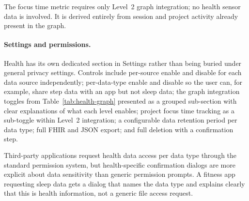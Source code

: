 The focus time metric requires only Level~2 graph integration; no health
sensor data is involved. It is derived entirely from session and project
activity already present in the graph.

\paragraph{Settings and permissions.}
Health has its own dedicated section in Settings rather than being buried under
general privacy settings. Controls include per-source enable and disable for
each data source independently; per-data-type enable and disable so the user
can, for example, share step data with an app but not sleep data; the graph
integration toggles from Table~\ref{tab:health-graph} presented as a grouped
sub-section with clear explanations of what each level enables; project focus
time tracking as a sub-toggle within Level~2 integration; a configurable
data retention period per data type; full FHIR and JSON export; and full
deletion with a confirmation step.

Third-party applications request health data access per data type through the
standard permission system, but health-specific confirmation dialogs are more
explicit about data sensitivity than generic permission prompts. A fitness app
requesting sleep data gets a dialog that names the data type and explains
clearly that this is health information, not a generic file access request.
